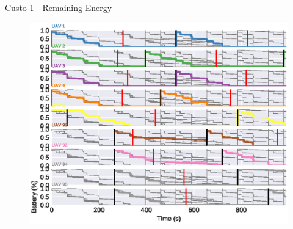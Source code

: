 \begin{frame}{Custo 1 - Remaining Energy}
            \begin{figure}[!htb]
                    \includegraphics[width=\textwidth]{custo_1/uav_remaining_energy_all.eps}
                \end{figure}
        \end{frame}